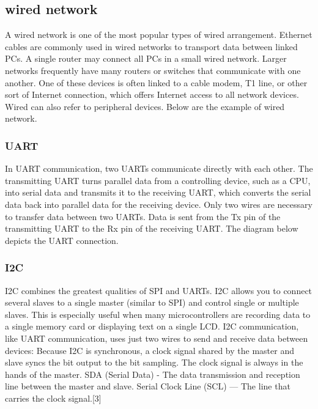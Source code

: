 \subsection{wired network}
A wired network is one of the most popular types of wired arrangement. Ethernet cables are commonly used in wired networks to transport data between linked PCs. A single router may connect all PCs in a small wired network. Larger networks frequently have many routers or switches that communicate with one another. One of these devices is often linked to a cable modem, T1 line, or other sort of Internet connection, which offers Internet access to all network devices. Wired can also refer to peripheral devices. Below are the example of wired network.

\subsubsection{UART}
In UART communication, two UARTs communicate directly with each other. The transmitting UART turns parallel data from a controlling device, such as a CPU, into serial data and transmits it to the receiving UART, which converts the serial data back into parallel data for the receiving device. Only two wires are necessary to transfer data between two UARTs. Data is sent from the Tx pin of the transmitting UART to the Rx pin of the receiving UART. The diagram below depicts the UART connection.
\subsubsection{I2C}
I2C combines the greatest qualities of SPI and UARTs. I2C allows you to connect several slaves to a single master (similar to SPI) and control single or multiple slaves. This is especially useful when many microcontrollers are recording data to a single memory card or displaying text on a single LCD. I2C communication, like UART communication, uses just two wires to send and receive data between devices: Because I2C is synchronous, a clock signal shared by the master and slave syncs the bit output to the bit sampling. The clock signal is always in the hands of the master. SDA (Serial Data) - The data transmission and reception line between the master and slave. Serial Clock Line (SCL) — The line that carries the clock signal.[3]

